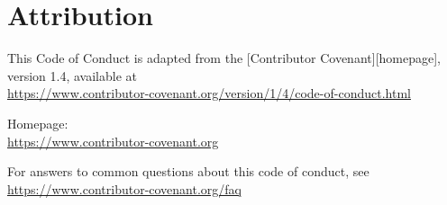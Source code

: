 \section*{Attribution}

  This Code of Conduct is adapted from the [Contributor Covenant][homepage], version 1.4,
  available at \\ {\small\url{https://www.contributor-covenant.org/version/1/4/code-of-conduct.html}}

  Homepage: \\ {\small\url{https://www.contributor-covenant.org}}

  For answers to common questions about this code of conduct, see \\
  {\small\url{https://www.contributor-covenant.org/faq}}


\clearpage

